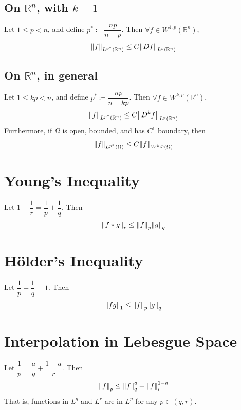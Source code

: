 \documentclass{article}
\def\Rl{\mathbb{R}}
\begin{document}
    \subsection{On $\Rl^n$, with $k=1$}
        Let $1 \leq p < n$, and define $p^* \coloneqq \dfrac{np}{n - p}$.  Then $\forall f \in W^{1,p}(\Rl^n)$,
        \begin{align*}
            \norm{f}_{L^{p^*}(\Rl^n)} \leq C\norm{Df}_{L^p(\Rl^n)}
        \end{align*}
    \subsection{On $\Rl^n$, in general}
        Let $1 \leq kp < n$, and define $p^* \coloneqq \dfrac{np}{n - kp}$.  Then $\forall f \in W^{k,p}(\Rl^n)$,
        \begin{align*}
            \norm{f}_{L^{p^*}(\Rl^n)} \leq C\norm{D^kf}_{L^p(\Rl^n)}
        \end{align*}
        Furthermore, if $\Omega$ is open, bounded, and has $C^1$ boundary, then
        \begin{align*}
            \norm{f}_{L^{p^*}(\Omega)} \leq C\norm{f}_{W^{k,p}(\Omega)}
        \end{align*}

\section{Young's Inequality}
    Let $1 + \dfrac{1}{r} = \dfrac{1}{p} + \dfrac{1}{q}$.  Then
    \begin{align*}
        \norm{f * g}_r \leq \norm{f}_p\norm{g}_q
    \end{align*}

\section{H\"{o}lder's Inequality}
    Let $\dfrac{1}{p} + \dfrac{1}{q} = 1$.  Then
    \begin{align*}
        \norm{fg}_1 \leq \norm{f}_p\norm{g}_q
    \end{align*}

\section{Interpolation in Lebesgue Space}
    Let $\dfrac{1}{p} = \dfrac{a}{q} + \dfrac{1-a}{r}$.  Then
    \begin{align*}
        \norm{f}_p \leq \norm{f}_q^a + \norm{f}_r^{1-a}
    \end{align*}
    That is, functions in $L^q$ and $L^r$ are in $L^p$ for any $p \in (q,r)$.
\end{document}
